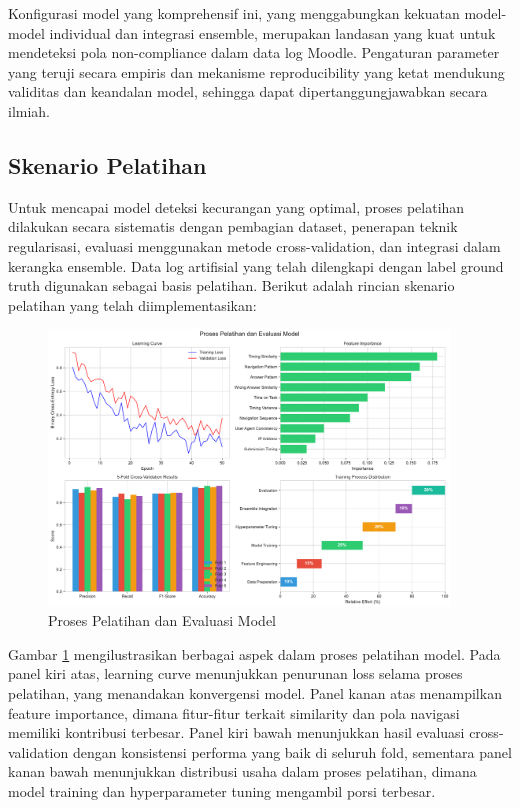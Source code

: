Konfigurasi model yang komprehensif ini, yang menggabungkan kekuatan model-model individual dan integrasi ensemble, merupakan landasan yang kuat untuk mendeteksi pola non-compliance dalam data log Moodle. Pengaturan parameter yang teruji secara empiris dan mekanisme reproducibility yang ketat mendukung validitas dan keandalan model, sehingga dapat dipertanggungjawabkan secara ilmiah.

\subsection{Skenario Pelatihan}
\label{subsec:skenarioPelatihan}

Untuk mencapai model deteksi kecurangan yang optimal, proses pelatihan dilakukan secara sistematis dengan pembagian dataset, penerapan teknik regularisasi, evaluasi menggunakan metode cross-validation, dan integrasi dalam kerangka ensemble. Data log artifisial yang telah dilengkapi dengan label ground truth digunakan sebagai basis pelatihan. Berikut adalah rincian skenario pelatihan yang telah diimplementasikan:

\begin{figure}[htbp]
    \centering
    \includegraphics[width=0.95\textwidth]{figures/training_process.pdf}
    \caption{Proses Pelatihan dan Evaluasi Model}
    \label{fig:training_process}
\end{figure}

Gambar \ref{fig:training_process} mengilustrasikan berbagai aspek dalam proses pelatihan model. Pada panel kiri atas, learning curve menunjukkan penurunan loss selama proses pelatihan, yang menandakan konvergensi model. Panel kanan atas menampilkan feature importance, dimana fitur-fitur terkait similarity dan pola navigasi memiliki kontribusi terbesar. Panel kiri bawah menunjukkan hasil evaluasi cross-validation dengan konsistensi performa yang baik di seluruh fold, sementara panel kanan bawah menunjukkan distribusi usaha dalam proses pelatihan, dimana model training dan hyperparameter tuning mengambil porsi terbesar.

